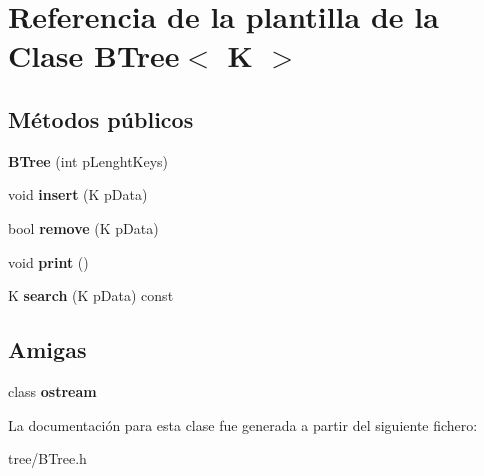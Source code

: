 \hypertarget{classBTree}{\section{Referencia de la plantilla de la Clase B\-Tree$<$ K $>$}
\label{classBTree}
}
\subsection*{Métodos públicos}
\begin{DoxyCompactItemize}
\item 
\hypertarget{classBTree_a7b77da63d8a36748b641ec7d7eb1ca7d}{{\bfseries B\-Tree} (int p\-Lenght\-Keys)}\label{classBTree_a7b77da63d8a36748b641ec7d7eb1ca7d}

\item 
\hypertarget{classBTree_aa23d18780a9491c5734bf2cb40330905}{void {\bfseries insert} (K p\-Data)}\label{classBTree_aa23d18780a9491c5734bf2cb40330905}

\item 
\hypertarget{classBTree_a7b0b5e717616c2f2349587eae5fe3e13}{bool {\bfseries remove} (K p\-Data)}\label{classBTree_a7b0b5e717616c2f2349587eae5fe3e13}

\item 
\hypertarget{classBTree_a98a7b173fd34c602682989ac31ca08e2}{void {\bfseries print} ()}\label{classBTree_a98a7b173fd34c602682989ac31ca08e2}

\item 
\hypertarget{classBTree_a45bcd8774b4bc322479bbd7d4a7ecbc4}{K {\bfseries search} (K p\-Data) const }\label{classBTree_a45bcd8774b4bc322479bbd7d4a7ecbc4}

\end{DoxyCompactItemize}
\subsection*{Amigas}
\begin{DoxyCompactItemize}
\item 
\hypertarget{classBTree_a900712b11e08ae40dad9e80a6d380142}{class {\bfseries ostream}}\label{classBTree_a900712b11e08ae40dad9e80a6d380142}

\end{DoxyCompactItemize}


La documentación para esta clase fue generada a partir del siguiente fichero\-:\begin{DoxyCompactItemize}
\item 
tree/B\-Tree.\-h\end{DoxyCompactItemize}
